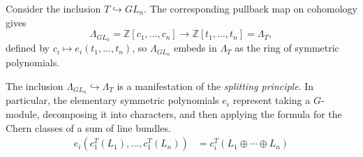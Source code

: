 \documentclass[12pt]{article}
\begin{document}
\begin{proposition} \label{prop:symmetric}
    Consider the inclusion $T \hookrightarrow GL_n$. The corresponding pullback map on cohomology gives
    \[\Lambda_{GL_n} = \mathbb{Z}[c_1,\ldots,c_n] \to \mathbb{Z}[t_1,\ldots,t_n] = \Lambda_T,\]
    defined by $c_i \mapsto e_i(t_1,\ldots,t_n)$, so $\Lambda_{GL_n}$ embeds in $\Lambda_T$ as the ring of symmetric polynomials.
\end{proposition}


\begin{remark}
    The inclusion $\Lambda_{GL_n} \hookrightarrow \Lambda_T$ is a manifestation of the \emph{splitting principle}. In particular, the elementary symmetric polynomials $e_i$ represent taking a $G$-module, decomposing it into characters, and then applying the formula for the Chern classes of a sum of line bundles. \begin{align*}
        e_i(c_1^T(L_1), \ldots, c_1^T(L_n)) & = c_i^T(L_1 \oplus \cdots \oplus L_n)
    \end{align*}
\end{remark}
\end{document}
